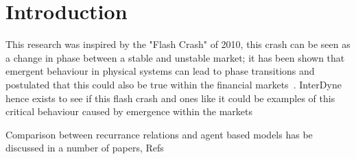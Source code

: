 \documentclass{article}
\begin{document}




\section{Introduction}








This research was inspired by the "Flash Crash" of 2010, this crash can be seen as a change in phase between a stable and unstable market; it has been shown that emergent behaviour in physical systems can lead to phase transitions and postulated that this could also be true within the financial markets~\cite{networkcastphorynature}. InterDyne hence exists to see if this flash crash and ones like it could be examples of this critical behaviour caused by emergence within the markets


Comparison between recurrance relations and agent based models has be discussed in a number of papers, Refs
%
\end{document}
